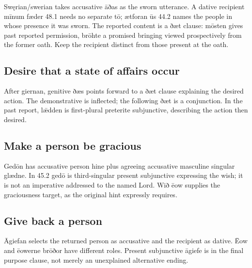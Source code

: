 Swęrian/\allowbreak{}swerian takes accusative āðas as the sworn utterance. A dative recipient mīnum fæder 48.1 needs no separate tō; ætforan ūs 44.2 names the people in whose presence it was sworn. The reported content is a ðæt clause: mōsten gives past reported permission, brōhte a promised bringing viewed prospectively from the former oath. Keep the recipient distinct from those present at the oath.

\subsection*{Desire that a state of affairs occur}

After giernan, genitive ðæs points forward to a ðæt clause explaining the desired action. The demonstrative is inflected; the following ðæt is a conjunction. In the past report, lǣdden is first-plural preterite subjunctive, describing the action then desired.

\subsection*{Make a person be gracious}

Gedōn has accusative person hine plus agreeing accusative masculine singular glædne. In 45.2 gedō is third-singular present subjunctive expressing the wish; it is not an imperative addressed to the named Lord. Wið ēow supplies the graciousness target, as the original hint expressly requires.

\subsection*{Give back a person}

Āgiefan selects the returned person as accusative and the recipient as dative. Ēow and ēowerne brōðor have different roles. Present subjunctive āgiefe is in the final purpose clause, not merely an unexplained alternative ending.

